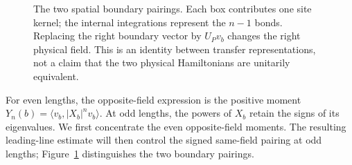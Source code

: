 \begin{figure}[!htbp]
\centering
{}
\caption{The two spatial boundary pairings. Each box contributes one
site kernel; the internal integrations represent the $n-1$ bonds.
Replacing the right boundary vector by $U_Pv_b$ changes the right
physical field. This is an identity between transfer representations,
not a claim that the two physical Hamiltonians are unitarily equivalent.}
\label{fig:boundary-pairings}
\end{figure}

For even lengths, the opposite-field expression is the positive moment
$Y_n(b)=\langle v_b,|X_b|^n v_b\rangle$.
At odd lengths, the powers of $X_b$ retain the signs of its eigenvalues.
We first concentrate the even opposite-field moments. The resulting
leading-line estimate will then control the signed same-field pairing
at odd lengths; Figure~\ref{fig:boundary-pairings} distinguishes the
two boundary pairings.
